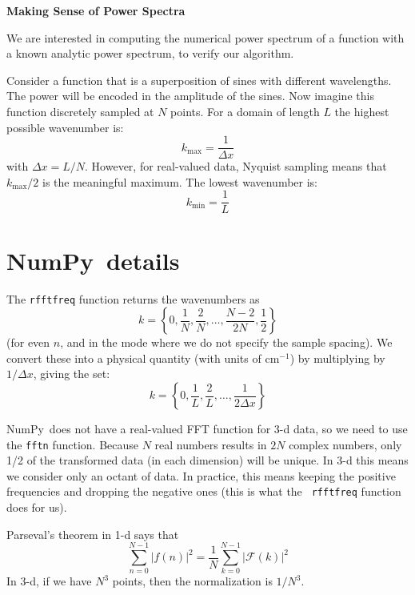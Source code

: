 \documentclass[11pt]{article}
\newcommand{\numpy}{{\sf NumPy}}
\begin{document}
\begin{center}
{\bf \Large Making Sense of Power Spectra}
\end{center}

We are interested in computing the numerical power spectrum of a
function with a known analytic power spectrum, to verify our
algorithm.

Consider a function that is a superposition of sines with different
wavelengths.  The power will be encoded in the amplitude of the sines.
Now imagine this function discretely sampled at $N$ points.  For a domain of
length $L$ the highest possible wavenumber is:
\begin{equation}
k_\mathrm{max} = \frac{1}{\Delta x}
\end{equation}
with $\Delta x = L/N$.  However, for real-valued data, Nyquist sampling
means that $k_\mathrm{max}/2$ is the meaningful maximum.
The lowest wavenumber is:
\begin{equation}
k_\mathrm{min} = \frac{1}{L}
\end{equation}


\section*{\numpy\ details}

The {\tt rfftfreq} function returns the wavenumbers as
\begin{equation}
k = \left \{ 0, \frac{1}{N}, \frac{2}{N}, \ldots, \frac{N-2}{2N}, \frac{1}{2} \right \}
\end{equation}
(for even $n$, and in the mode where we do not specify the sample spacing).
We convert these into a physical quantity (with units of cm$^{-1}$) by
multiplying by $1/\Delta x$, giving the set:
\begin{equation}
k = \left \{ 0, \frac{1}{L}, \frac{2}{L}, \ldots, \frac{1}{2\Delta x} \right \}
\end{equation}

\numpy\ does not have a real-valued FFT function for 3-d data, so we
need to use the {\tt fftn} function.  Because $N$ real numbers results
in $2N$ complex numbers, only 1/2 of the transformed data (in each
dimension) will be unique.  In 3-d this means we consider only an
octant of data.  In practice, this means keeping the positive
frequencies and dropping the negative ones (this is what the {\tt
  rfftfreq} function does for us).


Parseval's theorem in 1-d says that
\begin{equation}
\sum_{n=0}^{N-1} | f(n) |^2 = \frac{1}{N} \sum_{k=0}^{N-1} | \mathcal{F}(k) |^2
\end{equation}
In 3-d, if we have $N^3$ points, then the normalization is $1/N^3$.
\end{document}
